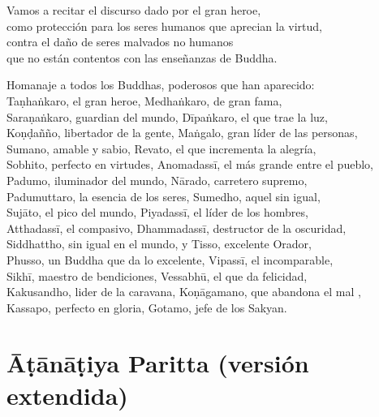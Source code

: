 {\setlength{\parskip}{0pt}%

\begin{soloonechants}
	Vamos a recitar el discurso dado por el gran heroe,\\ como protección para los seres humanos que aprecian la virtud,\\ contra el daño de seres malvados no humanos \\que no están contentos con las enseñanzas de Buddha.
\end{soloonechants}%
}

\vspace*{-2pt}

\englishText

\begin{onechants}
Homanaje a todos los Buddhas, poderosos que han aparecido:\\
Taṇhaṅkaro, el gran heroe, Medhaṅkaro, de gran fama,\\
Saraṇaṅkaro, guardian del mundo, Dīpaṅkaro, el que trae la luz,\\
Koṇḍañño, libertador de la gente, Maṅgalo, gran líder de las personas,\\
Sumano, amable y sabio, Revato, el que incrementa la alegría,\\
Sobhito, perfecto en virtudes, Anomadassī, el más grande entre el pueblo,\\
Padumo, iluminador del mundo, Nārado, carretero supremo,\\
Padumuttaro, la esencia de los seres, Sumedho, aquel sin igual,\\
Sujāto, el pico del mundo,  Piyadassī, el líder de los hombres,\\
Atthadassī, el compasivo, Dhammadassī, destructor de la oscuridad,\\
Siddhattho, sin igual en el mundo, y Tisso, excelente Orador,\\
Phusso, un Buddha que da lo excelente, Vipassī, el incomparable,\\
Sikhī, maestro de bendiciones, Vessabhū, el que da felicidad,\\
Kakusandho, lider de la caravana, Koṇāgamano, que abandona el mal ,\\
Kassapo, perfecto en gloria, Gotamo, jefe de los Sakyan.\\
\end{onechants}

\clearpage

\chapterTocSubIndentTrue
\chapter{Āṭānāṭiya Paritta (versión extendida)}

